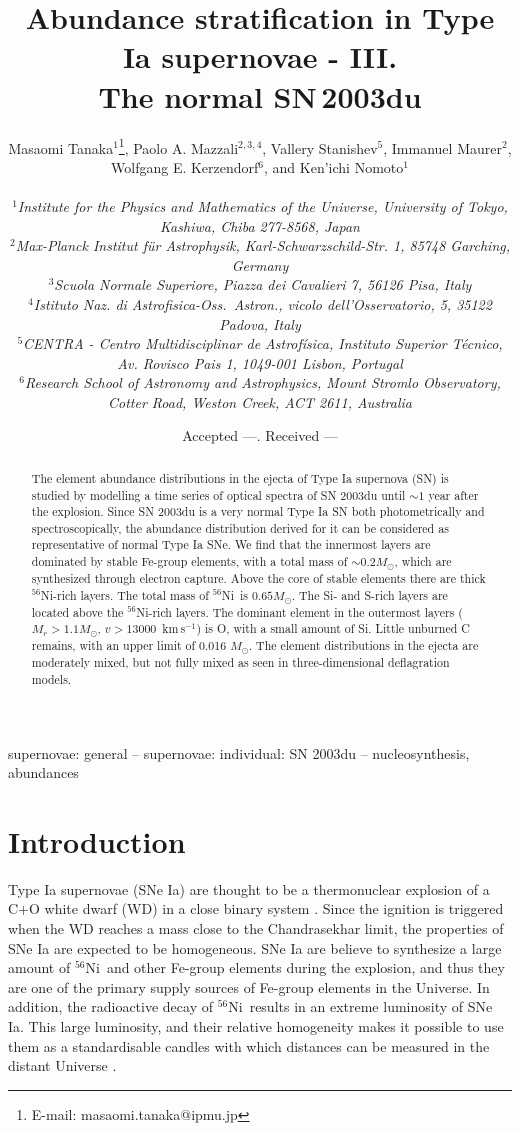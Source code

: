 \documentclass[usegraphicx,usenatbib]{mn2e}
\title[Abundance stratification in SN Ia - III. SN\,2003du]
{Abundance stratification in Type Ia supernovae - III. \\
The normal SN\,2003du}
\author[Tanaka et al.]{
\parbox[t]{\textwidth}{
Masaomi Tanaka$^{1}$\thanks{E-mail: masaomi.tanaka@ipmu.jp}, 
Paolo A. Mazzali$^{2,3,4}$, 
Vallery Stanishev$^{5}$, 
Immanuel Maurer$^{2}$,
Wolfgang E. Kerzendorf$^{6}$,
and
Ken'ichi Nomoto$^{1}$
}
\vspace*{6pt}\\
$^1${\it Institute for the Physics and Mathematics of the Universe, University of Tokyo, Kashiwa, Chiba 277-8568, Japan}\\
$^2${\it Max-Planck Institut f\"ur Astrophysik, Karl-Schwarzschild-Str. 1, 85748 Garching, Germany}\\
$^3${\it Scuola Normale Superiore, Piazza dei Cavalieri 7, 56126 Pisa, Italy}\\
$^4${\it Istituto Naz. di Astrofisica-Oss.\ Astron., vicolo dell'Osservatorio, 5, 35122 Padova, Italy }\\
$^5${\it CENTRA - Centro Multidisciplinar de Astrof\'isica, Instituto Superior T\'ecnico, Av. Rovisco Pais 1, 1049-001 Lisbon, Portugal}\\
$^6${\it Research School of Astronomy and Astrophysics, Mount Stromlo Observatory, Cotter Road, Weston Creek, ACT 2611, Australia}\\
}
\date{Accepted ---. Received ---}
\newcommand{\kms}{\mbox{\,km\,s$^{-1}$}}
\newcommand{\eg}{e.g.,\ }
\newcommand{\Msun}{M_{\odot}}
\newcommand{\Nifs}{$^{56}$Ni}
\begin{document}
\maketitle

\label{firstpage}

\begin{abstract}
The element abundance distributions in the ejecta of Type Ia supernova (SN) is
studied by modelling a time series of optical spectra of SN 2003du until $\sim
1$ year after the explosion. Since  SN 2003du is a very normal Type Ia SN both
photometrically and  spectroscopically, the abundance distribution derived for
it can be considered  as representative of normal Type Ia SNe.  We find that the
innermost layers are dominated by stable Fe-group elements, 
with a total mass of $\sim 0.2 \Msun$, 
which are synthesized through  electron capture.  Above the core of
stable elements there are thick \Nifs-rich layers. 
The total  mass of \Nifs\ is $0.65 \Msun$. 
The Si- and S-rich layers are located above the \Nifs-rich layers.
The dominant element in the outermost layers ($M_r > 1.1\Msun$,
$v > 13000$ \kms)  is O, with a small amount of Si. Little unburned
C remains, with an upper limit of 0.016 $\Msun$.
The element distributions in the ejecta are moderately mixed, 
but not fully mixed as seen in three-dimensional deflagration models.
\end{abstract}

\begin{keywords}
{supernovae: general -- supernovae: individual: SN 2003du -- nucleosynthesis, abundances}
\end{keywords}


\section{Introduction}

Type Ia supernovae (SNe Ia) are thought to be a thermonuclear explosion of
a C+O white dwarf (WD) in a close binary system
\citep[see][]{nomoto94Ia,hillebrandt00}. Since the ignition is triggered  when
the WD reaches a mass close to the Chandrasekhar limit, the properties of SNe Ia
are expected to be homogeneous.  SNe Ia are believe to synthesize a large amount
of \Nifs\ and other Fe-group elements during the explosion, and thus they are
one of the primary supply sources of Fe-group elements in the Universe. In
addition, the radioactive decay of \Nifs\ results in an extreme luminosity of
SNe Ia. This large luminosity, and their relative homogeneity  makes it possible
to use them as a standardisable candles with which distances can be measured in
the distant Universe \citep[\eg][]{phillips93, riess96, riess98, perlmutter99}.
\end{document}
